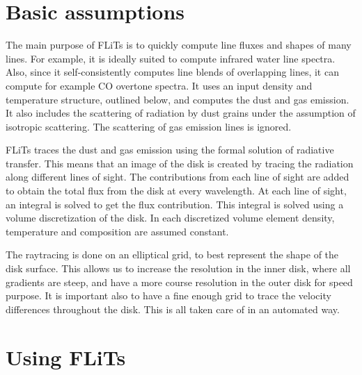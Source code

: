 \documentclass[12pt]{article}
\begin{document}
\section{Basic assumptions}

The main purpose of FLiTs is to quickly compute line fluxes and shapes of many lines. For example, it is ideally suited to compute infrared water line spectra. Also, since it self-consistently computes line blends of overlapping lines, it can compute for example CO overtone spectra. It uses an input density and temperature structure, outlined below, and computes the dust and gas emission. It also includes the scattering of radiation by dust grains under the assumption of isotropic scattering. The scattering of gas emission lines is ignored.

FLiTs traces the dust and gas emission using the formal solution of radiative transfer. This means that an image of the disk is created by tracing the radiation along different lines of sight. The contributions from each line of sight are added to obtain the total flux from the disk at every wavelength. At each line of sight, an integral is solved to get the flux contribution. This integral is solved using a volume discretization of the disk. In each discretized volume element density, temperature and composition are assumed constant.

The raytracing is done on an elliptical grid, to best represent the shape of the disk surface. This allows us to increase the resolution in the inner disk, where all gradients are steep, and have a more course resolution in the outer disk for speed purpose. It is important also to have a fine enough grid to trace the velocity differences throughout the disk. This is all taken care of in an automated way.

\section{Using FLiTs}
\end{document}
